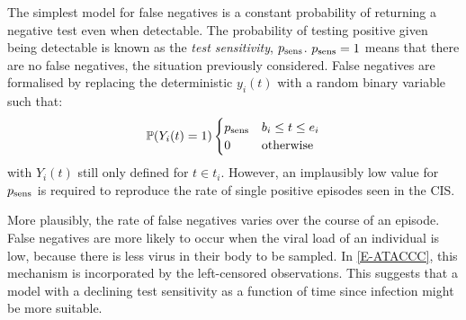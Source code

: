 \documentclass[thesis.tex]{subfiles}
\begin{document}
The simplest model for false negatives is a constant probability of returning a negative test even when detectable.
The probability of testing positive given being detectable is known as the \emph{test sensitivity}, $p_\text{sens}$.
$p_\text{sens} = 1$ means that there are no false negatives, the situation previously considered.
False negatives are formalised by replacing the deterministic $y_i(t)$ with a random binary variable such that:
\begin{equation}
  \operatorname{\mathbb{P}}(Y_i(t) = 1) \begin{cases}
      p_\text{sens} &b_i \leq t \leq e_i \\
      0 &\text{otherwise}
  \end{cases} 
\end{equation}
with $Y_i(t)$ still only defined for $t \in t_i$.
However, an implausibly low value for $p_\text{sens}$ is required to reproduce the rate of single positive episodes seen in the CIS.

More plausibly, the rate of false negatives varies over the course of an episode.
False negatives are more likely to occur when the viral load of an individual is low, because there is less virus in their body to be sampled.
In \cref{E-ATACCC}, this mechanism is incorporated by the left-censored observations.
This suggests that a model with a declining test sensitivity as a function of time since infection might be more suitable.
\end{document}

